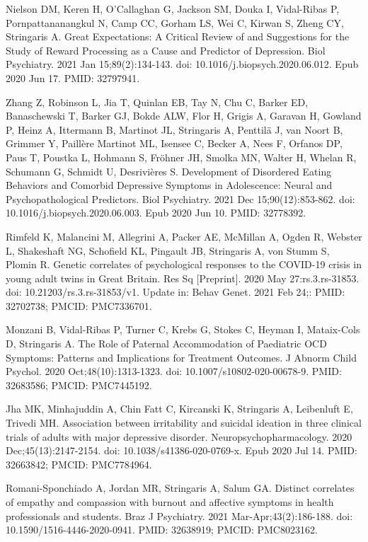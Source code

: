 \documentclass[
]{article}
\begin{document}
Nielson DM, Keren H, O'Callaghan G, Jackson SM, Douka I, Vidal-Ribas P,
Pornpattananangkul N, Camp CC, Gorham LS, Wei C, Kirwan S, Zheng CY,
Stringaris A. Great Expectations: A Critical Review of and Suggestions
for the Study of Reward Processing as a Cause and Predictor of
Depression. Biol Psychiatry. 2021 Jan 15;89(2):134-143. doi:
10.1016/j.biopsych.2020.06.012. Epub 2020 Jun 17. PMID: 32797941.

Zhang Z, Robinson L, Jia T, Quinlan EB, Tay N, Chu C, Barker ED,
Banaschewski T, Barker GJ, Bokde ALW, Flor H, Grigis A, Garavan H,
Gowland P, Heinz A, Ittermann B, Martinot JL, Stringaris A, Penttilä J,
van Noort B, Grimmer Y, Paillère Martinot ML, Isensee C, Becker A, Nees
F, Orfanos DP, Paus T, Poustka L, Hohmann S, Fröhner JH, Smolka MN,
Walter H, Whelan R, Schumann G, Schmidt U, Desrivières S. Development of
Disordered Eating Behaviors and Comorbid Depressive Symptoms in
Adolescence: Neural and Psychopathological Predictors. Biol Psychiatry.
2021 Dec 15;90(12):853-862. doi: 10.1016/j.biopsych.2020.06.003. Epub
2020 Jun 10. PMID: 32778392.

Rimfeld K, Malancini M, Allegrini A, Packer AE, McMillan A, Ogden R,
Webster L, Shakeshaft NG, Schofield KL, Pingault JB, Stringaris A, von
Stumm S, Plomin R. Genetic correlates of psychological responses to the
COVID-19 crisis in young adult twins in Great Britain. Res Sq
{[}Preprint{]}. 2020 May 27:rs.3.rs-31853. doi:
10.21203/rs.3.rs-31853/v1. Update in: Behav Genet. 2021 Feb 24;: PMID:
32702738; PMCID: PMC7336701.

Monzani B, Vidal-Ribas P, Turner C, Krebs G, Stokes C, Heyman I,
Mataix-Cols D, Stringaris A. The Role of Paternal Accommodation of
Paediatric OCD Symptoms: Patterns and Implications for Treatment
Outcomes. J Abnorm Child Psychol. 2020 Oct;48(10):1313-1323. doi:
10.1007/s10802-020-00678-9. PMID: 32683586; PMCID: PMC7445192.

Jha MK, Minhajuddin A, Chin Fatt C, Kircanski K, Stringaris A,
Leibenluft E, Trivedi MH. Association between irritability and suicidal
ideation in three clinical trials of adults with major depressive
disorder. Neuropsychopharmacology. 2020 Dec;45(13):2147-2154. doi:
10.1038/s41386-020-0769-x. Epub 2020 Jul 14. PMID: 32663842; PMCID:
PMC7784964.

Romani-Sponchiado A, Jordan MR, Stringaris A, Salum GA. Distinct
correlates of empathy and compassion with burnout and affective symptoms
in health professionals and students. Braz J Psychiatry. 2021
Mar-Apr;43(2):186-188. doi: 10.1590/1516-4446-2020-0941. PMID: 32638919;
PMCID: PMC8023162.
\end{document}
